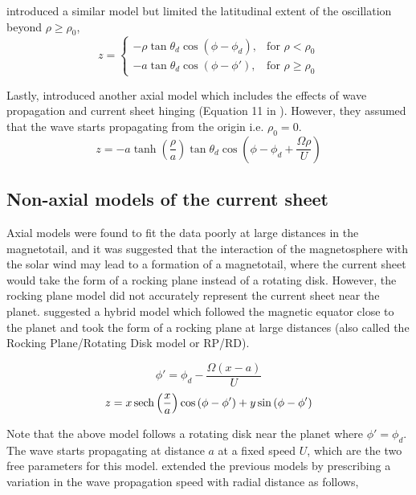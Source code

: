  introduced a similar model but limited the latitudinal extent of the oscillation beyond $\rho \geq \rho_0$,
\begin{equation}
    z = \begin{cases}
    -\rho \tan\theta_d \cos\left(\phi - \phi_d\right), & \text{for } \rho < \rho_0\\
    -a \tan\theta_d \cos\left(\phi - \phi'\right),  & \text{for } \rho \geq \rho_0
    \end{cases}
\end{equation}

Lastly,  introduced another axial model which includes the effects of wave propagation and current sheet hinging (Equation 11 in ). However, they assumed that the wave starts propagating from the origin i.e. $\rho_0=0$.
\begin{equation}
    z = -a \tanh\left(\frac{\rho}{a}\right) \tan\theta_d \cos\left(\phi - \phi_d + \frac{\Omega \rho}{U}\right)
    \label{eqn:behannon1981}
\end{equation}

\subsection{Non-axial models of the current sheet}
Axial models were found to fit the data poorly at large distances in the magnetotail, and it was suggested that the interaction of the magnetosphere with the solar wind may lead to a formation of a magnetotail, where the current sheet would take the form of a rocking plane instead of a rotating disk. However, the rocking plane model did not accurately represent the current sheet near the planet.  suggested a hybrid model which followed the magnetic equator close to the planet and took the form of a rocking plane at large distances (also called the Rocking Plane/Rotating Disk model or RP/RD).

\begin{equation}
    \phi' = \phi_d - \frac{\Omega \left(x - a\right)}{U}
\end{equation}
\begin{equation}
    z = x \operatorname{sech} \left( \frac{x}{a} \right) \cos\left(\phi - \phi' \right) + y \sin\left(\phi - \phi' \right)  
\end{equation}

Note that the above model follows a rotating disk near the planet where $\phi'=\phi_d$. The wave starts propagating at distance $a$ at a fixed speed $U$, which are the two free parameters for this model.  extended the previous models by prescribing a variation in the wave propagation speed with radial distance as follows,


